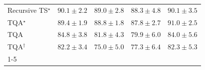 \begin{tabular}{l|cccc|}
Recursive TS$^\star$ & {\cellcolor[HTML]{034C78}} \color[HTML]{F1F1F1} $90.1\pm 2.2$ & {\cellcolor[HTML]{045483}} \color[HTML]{F1F1F1} $89.0\pm 2.8$ & {\cellcolor[HTML]{04588A}} \color[HTML]{F1F1F1} $88.3\pm 4.8$ & {\cellcolor[HTML]{034C78}} \color[HTML]{F1F1F1} $90.1\pm 3.5$ \\
TQA$^\star$ & {\cellcolor[HTML]{045280}} \color[HTML]{F1F1F1} $89.4\pm 1.9$ & {\cellcolor[HTML]{045585}} \color[HTML]{F1F1F1} $88.8\pm 1.8$ & {\cellcolor[HTML]{045B8E}} \color[HTML]{F1F1F1} $87.8\pm 2.7$ & {\cellcolor[HTML]{03476F}} \color[HTML]{F1F1F1} $91.0\pm 2.5$ \\
TQA & {\cellcolor[HTML]{0567A2}} \color[HTML]{F1F1F1} $84.8\pm 3.8$ & {\cellcolor[HTML]{0F76B3}} \color[HTML]{F1F1F1} $81.8\pm 4.3$ & {\cellcolor[HTML]{2081B9}} \color[HTML]{F1F1F1} $79.9\pm 6.0$ & {\cellcolor[HTML]{056BA7}} \color[HTML]{F1F1F1} $84.0\pm 5.6$ \\
TQA$^\dagger$ & {\cellcolor[HTML]{0A73B2}} \color[HTML]{F1F1F1} $82.2\pm 3.4$ & {\cellcolor[HTML]{549CC7}} \color[HTML]{F1F1F1} $75.0\pm 5.0$ & {\cellcolor[HTML]{3991C1}} \color[HTML]{F1F1F1} $77.3\pm 6.4$ & {\cellcolor[HTML]{0A73B2}} \color[HTML]{F1F1F1} $82.3\pm 5.3$ \\
\cline{1-5}
\bottomrule
\end{tabular}
